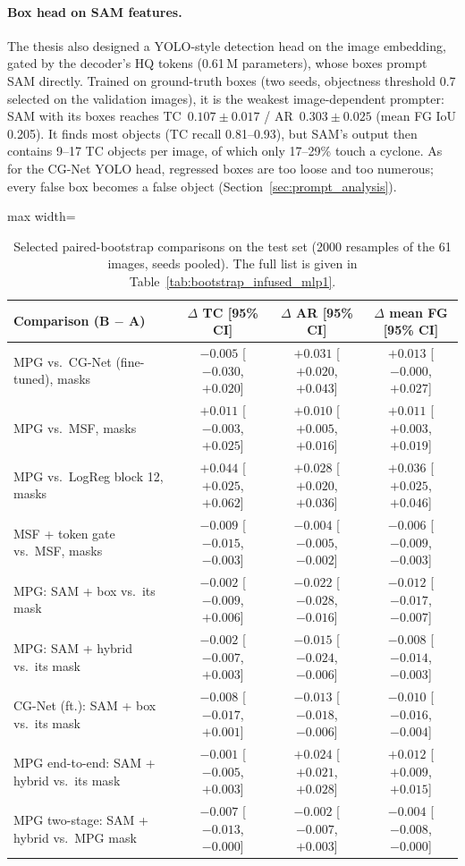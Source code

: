 \paragraph{Box head on SAM features.} The thesis also designed a YOLO-style detection head on the image embedding,
gated by the decoder's HQ tokens (0.61\,M parameters), whose boxes prompt SAM directly. Trained on ground-truth boxes
(two seeds, objectness threshold 0.7 selected on the validation images), it is the weakest image-dependent prompter:
SAM with its boxes reaches TC~$0.107\pm0.017$ / AR~$0.303\pm0.025$ (mean FG IoU 0.205). It finds most objects (TC
recall 0.81--0.93), but SAM's output then contains 9--17 TC objects per image, of which only 17--29\% touch a
cyclone. As for the CG-Net YOLO
head, regressed boxes are too loose and too numerous; every false box becomes a false object
(Section~\ref{sec:prompt_analysis}).

\begin{table}[htbp]
\centering
\small
\begin{adjustbox}{max width=\linewidth}
\begin{tabular}{lccc}
\toprule
Comparison (B $-$ A) & $\Delta$ TC [95\% CI] & $\Delta$ AR [95\% CI] & $\Delta$ mean FG [95\% CI] \\
\midrule
MPG vs.\ CG-Net (fine-tuned), masks & $-0.005$ [$-0.030$, $+0.020$] & $\mathbf{+0.031}$ [$+0.020$, $+0.043$] & $+0.013$ [$-0.000$, $+0.027$] \\
MPG vs.\ MSF, masks & $+0.011$ [$-0.003$, $+0.025$] & $+0.010$ [$+0.005$, $+0.016$] & $\mathbf{+0.011}$ [$+0.003$, $+0.019$] \\
MPG vs.\ LogReg block 12, masks & $+0.044$ [$+0.025$, $+0.062$] & $+0.028$ [$+0.020$, $+0.036$] & $+0.036$ [$+0.025$, $+0.046$] \\
MSF + token gate vs.\ MSF, masks & $-0.009$ [$-0.015$, $-0.003$] & $-0.004$ [$-0.005$, $-0.002$] & $-0.006$ [$-0.009$, $-0.003$] \\
MPG: SAM + box vs.\ its mask & $-0.002$ [$-0.009$, $+0.006$] & $-0.022$ [$-0.028$, $-0.016$] & $-0.012$ [$-0.017$, $-0.007$] \\
MPG: SAM + hybrid vs.\ its mask & $-0.002$ [$-0.007$, $+0.003$] & $-0.015$ [$-0.024$, $-0.006$] & $-0.008$ [$-0.014$, $-0.003$] \\
CG-Net (ft.): SAM + box vs.\ its mask & $-0.008$ [$-0.017$, $+0.001$] & $-0.013$ [$-0.018$, $-0.006$] & $-0.010$ [$-0.016$, $-0.004$] \\
MPG end-to-end: SAM + hybrid vs.\ its mask & $-0.001$ [$-0.005$, $+0.003$] & $+0.024$ [$+0.021$, $+0.028$] & $+0.012$ [$+0.009$, $+0.015$] \\
MPG two-stage: SAM + hybrid vs.\ MPG mask & $-0.007$ [$-0.013$, $-0.000$] & $-0.002$ [$-0.007$, $+0.003$] & $-0.004$ [$-0.008$, $-0.000$] \\
\bottomrule
\end{tabular}
\end{adjustbox}
\caption{Selected paired-bootstrap comparisons on the test set (2000 resamples of the 61 images, seeds pooled). The
full list is given in Table~\ref{tab:bootstrap_infused_mlp1}.}
\label{tab:bootstrap_selected}
\end{table}

